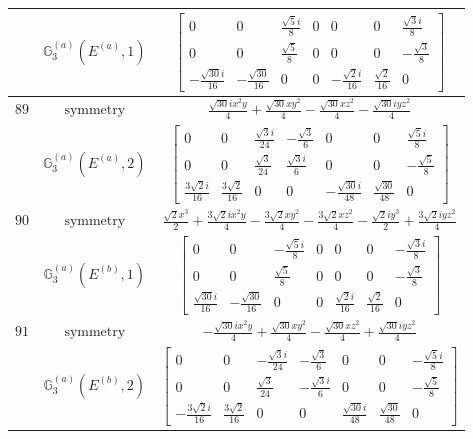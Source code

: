 \documentclass[fleqn,8pt,landscape]{jsarticle}
\begin{document}
\begin{longtable}{ccc}
$  $ & $ \mathbb{G}_{3}^{(a)}(E^{(a)},1) $ & $ \begin{bmatrix} 0 & 0 & \frac{\sqrt{5} i}{8} & 0 & 0 & 0 & \frac{\sqrt{3} i}{8} \\ 0 & 0 & \frac{\sqrt{5}}{8} & 0 & 0 & 0 & - \frac{\sqrt{3}}{8} \\ - \frac{\sqrt{30} i}{16} & - \frac{\sqrt{30}}{16} & 0 & 0 & - \frac{\sqrt{2} i}{16} & \frac{\sqrt{2}}{16} & 0 \end{bmatrix} $ \\ \hline
$ 89 $ & $ \text{symmetry} $ & $ \frac{\sqrt{30} i x^{2} y}{4} + \frac{\sqrt{30} x y^{2}}{4} - \frac{\sqrt{30} x z^{2}}{4} - \frac{\sqrt{30} i y z^{2}}{4} $ \\
$  $ & $ \mathbb{G}_{3}^{(a)}(E^{(a)},2) $ & $ \begin{bmatrix} 0 & 0 & \frac{\sqrt{3} i}{24} & - \frac{\sqrt{3}}{6} & 0 & 0 & \frac{\sqrt{5} i}{8} \\ 0 & 0 & \frac{\sqrt{3}}{24} & \frac{\sqrt{3} i}{6} & 0 & 0 & - \frac{\sqrt{5}}{8} \\ \frac{3 \sqrt{2} i}{16} & \frac{3 \sqrt{2}}{16} & 0 & 0 & - \frac{\sqrt{30} i}{48} & \frac{\sqrt{30}}{48} & 0 \end{bmatrix} $ \\ \hline
$ 90 $ & $ \text{symmetry} $ & $ \frac{\sqrt{2} x^{3}}{2} + \frac{3 \sqrt{2} i x^{2} y}{4} - \frac{3 \sqrt{2} x y^{2}}{4} - \frac{3 \sqrt{2} x z^{2}}{4} - \frac{\sqrt{2} i y^{3}}{2} + \frac{3 \sqrt{2} i y z^{2}}{4} $ \\
$  $ & $ \mathbb{G}_{3}^{(a)}(E^{(b)},1) $ & $ \begin{bmatrix} 0 & 0 & - \frac{\sqrt{5} i}{8} & 0 & 0 & 0 & - \frac{\sqrt{3} i}{8} \\ 0 & 0 & \frac{\sqrt{5}}{8} & 0 & 0 & 0 & - \frac{\sqrt{3}}{8} \\ \frac{\sqrt{30} i}{16} & - \frac{\sqrt{30}}{16} & 0 & 0 & \frac{\sqrt{2} i}{16} & \frac{\sqrt{2}}{16} & 0 \end{bmatrix} $ \\ \hline
$ 91 $ & $ \text{symmetry} $ & $ - \frac{\sqrt{30} i x^{2} y}{4} + \frac{\sqrt{30} x y^{2}}{4} - \frac{\sqrt{30} x z^{2}}{4} + \frac{\sqrt{30} i y z^{2}}{4} $ \\
$  $ & $ \mathbb{G}_{3}^{(a)}(E^{(b)},2) $ & $ \begin{bmatrix} 0 & 0 & - \frac{\sqrt{3} i}{24} & - \frac{\sqrt{3}}{6} & 0 & 0 & - \frac{\sqrt{5} i}{8} \\ 0 & 0 & \frac{\sqrt{3}}{24} & - \frac{\sqrt{3} i}{6} & 0 & 0 & - \frac{\sqrt{5}}{8} \\ - \frac{3 \sqrt{2} i}{16} & \frac{3 \sqrt{2}}{16} & 0 & 0 & \frac{\sqrt{30} i}{48} & \frac{\sqrt{30}}{48} & 0 \end{bmatrix} $ \\ \hline

\end{longtable}
\end{document}
